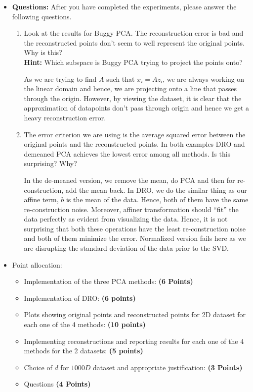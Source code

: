 \documentclass[a4paper]{article}
\theoremstyle{definition}
\newenvironment{soln}{
    \leavevmode\color{blue}\ignorespaces
}{}
\begin{document}
\begin{itemize}
\item \textbf{Questions:} After you have completed the experiments, please answer the following questions.
\begin{enumerate}
\item Look at the results for Buggy PCA. The reconstruction error is bad and the
reconstructed points don't seem to well represent the original points. Why is
this? \\
\textbf{Hint: } Which subspace is Buggy PCA trying to project the points
onto?
\begin{soln}
    As we are trying to find $A$ such that $x_i = Az_i$, we are always working on the linear domain and hence, we are projecting onto a line that passes through the origin. However, by viewing the dataset, it is clear that the approximation of datapoints don't pass through origin and hence we get a heavy reconstruction error.
\end{soln}
\item The error criterion we are using is the average squared error 
between the original points and the reconstructed points.
In both examples DRO and demeaned PCA achieves the lowest error among all
methods. 
Is this surprising? Why?
\begin{soln}
    In the de-meaned version, we remove the mean, do PCA and then for re-construction, add the mean back. In DRO, we do the similar thing as our affine term, $b$ is the mean of the data. Hence, both of them have the same re-construction noise. Moreover, affiner transformation should ``fit'' the data perfectly as evident from visualizing the data. Hence, it is not surprising that both these operations have the least re-construction noise and both of them minimize the error. Normalized version fails here as we are disrupting the standard deviation of the data prior to the SVD.
\end{soln}
\end{enumerate}

\item Point allocation:
\begin{itemize}
\item Implementation of the three PCA methods: \textbf{(6 Points)}
\item Implementation of DRO: \textbf{(6 points)}
\item Plots showing original points and reconstructed points for 2D dataset for each one of the 4 methods: \textbf{(10 points)}
\item Implementing reconstructions and reporting results for each one of the 4 methods for the 2 datasets: \textbf{(5 points)}
\item Choice of $d$ for $1000D$ dataset and appropriate justification:
\textbf{(3 Points)}
\item Questions \textbf{(4 Points)}
\end{itemize}

\end{itemize}
\end{document}
